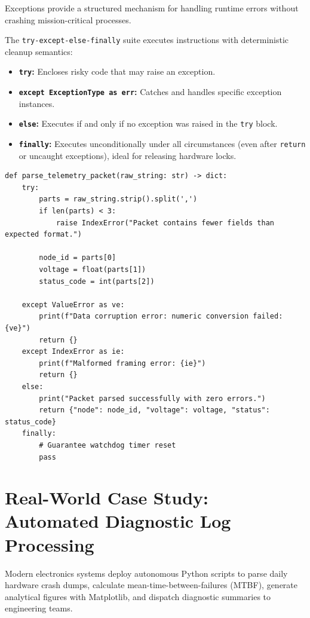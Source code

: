 Exceptions provide a structured mechanism for handling runtime errors without crashing mission-critical processes.

\begin{definition}
The \texttt{try-except-else-finally} suite executes instructions with deterministic cleanup semantics:
\begin{itemize}[leftmargin=1.8em, itemsep=2pt]
    \item \textbf{\texttt{try}:} Encloses risky code that may raise an exception.
    \item \textbf{\texttt{except ExceptionType as err}:} Catches and handles specific exception instances.
    \item \textbf{\texttt{else}:} Executes if and only if no exception was raised in the \texttt{try} block.
    \item \textbf{\texttt{finally}:} Executes unconditionally under all circumstances (even after \texttt{return} or uncaught exceptions), ideal for releasing hardware locks.
\end{itemize}
\end{definition}

\begin{lstlisting}[caption={Comprehensive Exception Handling Pattern}]
def parse_telemetry_packet(raw_string: str) -> dict:
    try:
        parts = raw_string.strip().split(',')
        if len(parts) < 3:
            raise IndexError("Packet contains fewer fields than expected format.")
        
        node_id = parts[0]
        voltage = float(parts[1])
        status_code = int(parts[2])
        
    except ValueError as ve:
        print(f"Data corruption error: numeric conversion failed: {ve}")
        return {}
    except IndexError as ie:
        print(f"Malformed framing error: {ie}")
        return {}
    else:
        print("Packet parsed successfully with zero errors.")
        return {"node": node_id, "voltage": voltage, "status": status_code}
    finally:
        # Guarantee watchdog timer reset
        pass
\end{lstlisting}

\section{Real-World Case Study: Automated Diagnostic Log Processing}
Modern electronics systems deploy autonomous Python scripts to parse daily hardware crash dumps, calculate mean-time-between-failures (MTBF), generate analytical figures with Matplotlib, and dispatch diagnostic summaries to engineering teams.

